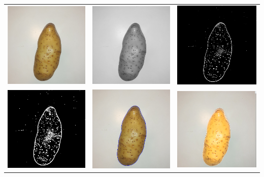 \documentclass[12pt]{beamer}
\begin{document}
\begin{frame}
\begin{table}
    \centering
    \begin{tabular}{ccc}
    
        \includegraphics[width=0.25\linewidth]{gaussian.png} &
        \includegraphics[width=0.25\linewidth]{gris.png}  &
        \includegraphics[width=0.25\linewidth]{binar.png} \\
        \includegraphics[width=0.25\linewidth]{morf.png} &
        \includegraphics[width=0.25\linewidth]{contornos.png} &
        \includegraphics[width=0.25\linewidth]{mask.png} 


    \end{tabular}
    \label{tab:filtros}
\end{table}
\end{frame}
\end{document}
